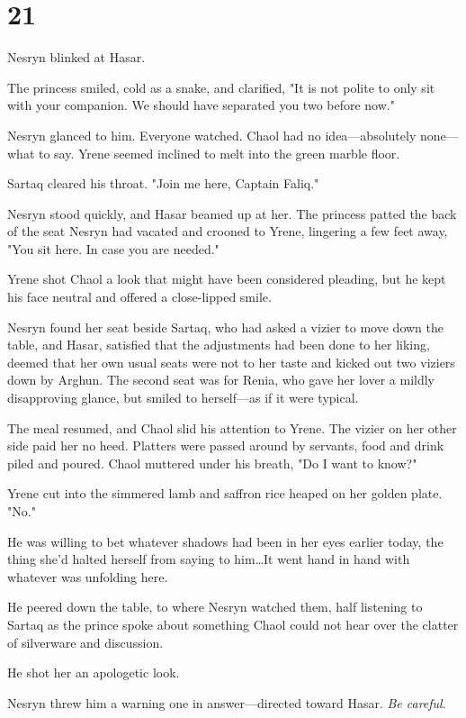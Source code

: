 
\chapter{21}

Nesryn blinked at Hasar.

The princess smiled, cold as a snake, and clarified, "It is not polite to only sit with your companion.
We should have separated you two before now."

Nesryn glanced to him.
Everyone watched.
Chaol had no idea---absolutely none---what to say.
Yrene seemed inclined to melt into the green marble floor.

Sartaq cleared his throat.
"Join me here, Captain Faliq."

Nesryn stood quickly, and Hasar beamed up at her.
The princess patted the back of the seat Nesryn had vacated and crooned to Yrene, lingering a few feet away, "You sit here.
In case you are needed."

Yrene shot Chaol a look that might have been considered pleading, but he kept his face neutral and offered a close-lipped smile.

Nesryn found her seat beside Sartaq, who had asked a vizier to move down the table, and Hasar, satisfied that the adjustments had been done to her liking, deemed that her own usual seats were not to her taste and kicked out two viziers down by Arghun.
The second seat was for Renia, who gave her lover a mildly disapproving glance, but smiled to herself---as if it were typical.

The meal resumed, and Chaol slid his attention to Yrene.
The vizier on her other side paid her no heed.
Platters were passed around by servants, food and drink piled and poured.
Chaol muttered under his breath, "Do I want to know?"

Yrene cut into the simmered lamb and saffron rice heaped on her golden plate.
"No."

He was willing to bet whatever shadows had been in her eyes earlier today, the thing she'd halted herself from saying to him\ldots It went hand in hand with whatever was unfolding here.

He peered down the table, to where Nesryn watched them, half listening to Sartaq as the prince spoke about something Chaol could not hear over the clatter of silverware and discussion.

He shot her an apologetic look.

Nesryn threw him a warning one in answer---directed toward Hasar.
\emph{Be careful}.


